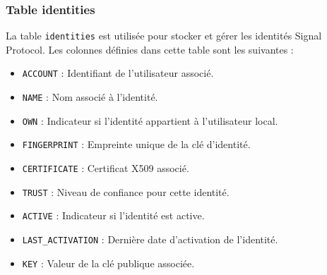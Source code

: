 \documentclass[a4paper,11pt]{article}
\begin{document}
\subsubsection*{Table identities}

La table \texttt{identities} est utilisée pour stocker et gérer les identités Signal Protocol. Les colonnes définies dans cette table sont les suivantes :

\begin{itemize}
    \item \texttt{ACCOUNT} : Identifiant de l'utilisateur associé.
    \item \texttt{NAME} : Nom associé à l'identité.
    \item \texttt{OWN} : Indicateur si l'identité appartient à l'utilisateur local.
    \item \texttt{FINGERPRINT} : Empreinte unique de la clé d'identité.
    \item \texttt{CERTIFICATE} : Certificat X509 associé.
    \item \texttt{TRUST} : Niveau de confiance pour cette identité.
    \item \texttt{ACTIVE} : Indicateur si l'identité est active.
    \item \texttt{LAST\_ACTIVATION} : Dernière date d'activation de l'identité.
    \item \texttt{KEY} : Valeur de la clé publique associée.
\end{itemize}
\end{document}
